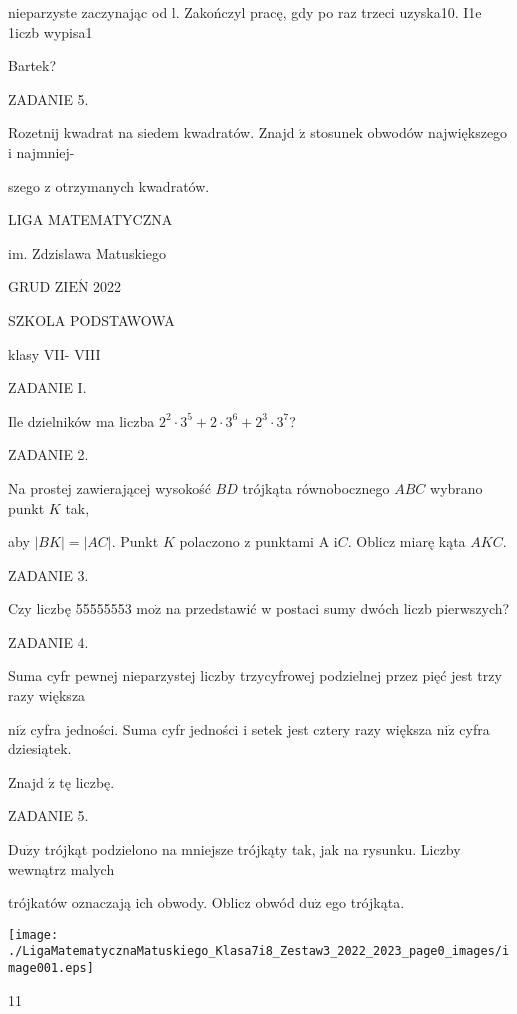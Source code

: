 \documentclass[a4paper,12pt]{article}
\begin{document}
nieparzyste zaczynając od l. Zakończyl pracę, gdy po raz trzeci uzyska10. I1e 1iczb wypisa1

Bartek?

ZADANIE 5.

Rozetnij kwadrat na siedem kwadratów. Znajd $\acute{\mathrm{z}}$ stosunek obwodów największego i najmniej-

szego z otrzymanych kwadratów.






LIGA MATEMATYCZNA

im. Zdzislawa Matuskiego

GRUD Z$\mathrm{I}\mathrm{E}\acute{\mathrm{N}}$ 2022

SZKOLA PODSTAWOWA

klasy VII- VIII

ZADANIE I.

Ile dzielników ma liczba $2^{2}\cdot 3^{5}+2\cdot 3^{6}+2^{3}\cdot 3^{7}$?

ZADANIE 2.

Na prostej zawierającej wysokość $BD$ trójkąta równobocznego $ABC$ wybrano punkt $K$ tak,

aby $|BK|=|AC|$. Punkt $K$ polaczono z punktami A $\mathrm{i}C$. Oblicz miarę kąta $AKC.$

ZADANIE 3.

Czy liczbę 55555553 $\mathrm{m}\mathrm{o}\dot{\mathrm{z}}$ na przedstawić w postaci sumy dwóch liczb pierwszych?

ZADANIE 4.

Suma cyfr pewnej nieparzystej liczby trzycyfrowej podzielnej przez pięć jest trzy razy większa

$\mathrm{n}\mathrm{i}\dot{\mathrm{z}}$ cyfra jedności. Suma cyfr jedności i setek jest cztery razy większa $\mathrm{n}\mathrm{i}\dot{\mathrm{z}}$ cyfra dziesiątek.

Znajd $\acute{\mathrm{z}}$ tę liczbę.

ZADANIE 5.

$\mathrm{D}\mathrm{u}\dot{\mathrm{z}}\mathrm{y}$ trójkąt podzielono na mniejsze trójkąty tak, jak na rysunku. Liczby wewnątrz malych

trójkatów oznaczają ich obwody. Oblicz obwód $\mathrm{d}\mathrm{u}\dot{\mathrm{z}}$ ego trójkąta.
\begin{center}
\texttt{[image: ./LigaMatematycznaMatuskiego\_Klasa7i8\_Zestaw3\_2022\_2023\_page0\_images/image001.eps]}
\end{center}
11
\end{document}
